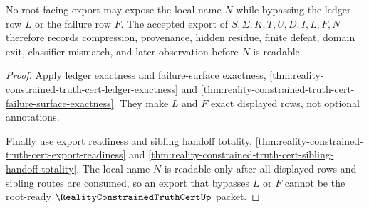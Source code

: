 \begin{theorem}
\label{thm:reality-constrained-truth-cert-root-ledger-nonescape}
No root-facing export may expose the local name $N$ while bypassing the ledger
row $L$ or the failure row $F$. The accepted export of
$S,\Sigma,K,T,U,D,I,L,F,N$ therefore records compression, provenance, hidden
residue, finite defeat, domain exit, classifier mismatch, and later observation
before $N$ is readable.
\end{theorem}
\begin{proof}
Apply ledger exactness and failure-surface exactness,
\autoref{thm:reality-constrained-truth-cert-ledger-exactness} and
\autoref{thm:reality-constrained-truth-cert-failure-surface-exactness}. They
make $L$ and $F$ exact displayed rows, not optional annotations.

Finally use export readiness and sibling handoff totality,
\autoref{thm:reality-constrained-truth-cert-export-readiness} and
\autoref{thm:reality-constrained-truth-cert-sibling-handoff-totality}. The local
name $N$ is readable only after all displayed rows and sibling routes are
consumed, so an export that bypasses $L$ or $F$ cannot be the root-ready
$\RealityConstrainedTruthCertUp$ packet.
\end{proof}
